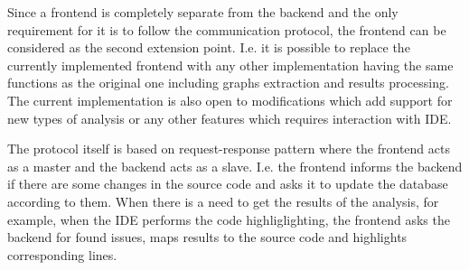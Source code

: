 Since a frontend is completely separate from the backend and the only requirement for it is to follow the communication protocol, the frontend can be considered as the second extension point.
I.e. it is possible to replace the currently implemented frontend with any other implementation having the same functions as the original one including graphs extraction and results processing.
The current implementation is also open to modifications which add support for new types of analysis or any other features which requires interaction with IDE.

The protocol itself is based on request-response pattern where the frontend acts as a master and the backend acts as a slave.
I.e. the frontend informs the backend if there are some changes in the source code and asks it to update the database according to them.
When there is a need to get the results of the analysis, for example, when the IDE performs the code highliglighting, the frontend asks the backend for found issues, maps results to the source code and highlights corresponding lines.
